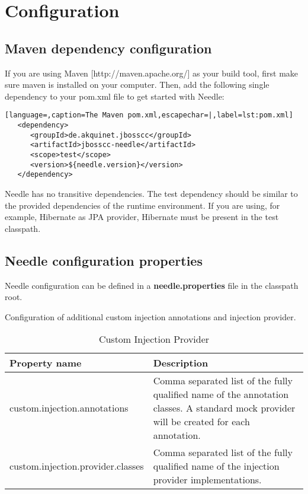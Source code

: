 \chapter{Configuration}

\section{Maven dependency configuration}
If you are using Maven [http://maven.apache.org/] as your build tool, first make sure maven is installed on your computer.
Then, add the following single dependency to your pom.xml file to get started with Needle:

\begin{lstlisting}[language=,caption=The Maven pom.xml,escapechar=|,label=lst:pom.xml]
   <dependency>
      <groupId>de.akquinet.jbosscc</groupId>
      <artifactId>jbosscc-needle</artifactId>
      <scope>test</scope>
      <version>${needle.version}</version>
   </dependency>
\end{lstlisting}

Needle has no transitive dependencies. The test dependency should be similar to the provided dependencies of the runtime environment.
If you are using, for example, Hibernate as JPA provider, Hibernate must be present in the test classpath.

\section{Needle configuration properties}

Needle configuration can be defined in a \textbf{needle.properties} file in the classpath root.

\parskip 14pt
\parindent 0pt
Configuration of additional custom injection annotations and injection provider.
\begin{table}[H]
\centering
\begin{tabular}{p{6cm}p{11cm}} \toprule
    \textbf{Property name} & \textbf{Description} \\ \midrule
    custom.injection.annotations & Comma separated list of the fully qualified name of the annotation classes. A standard mock provider will be created for each annotation. \\
    custom.injection.provider.classes & Comma separated list of the fully qualified name of the injection provider implementations. \\
\bottomrule
\end{tabular}
\caption{Custom Injection Provider}
\end{table}

